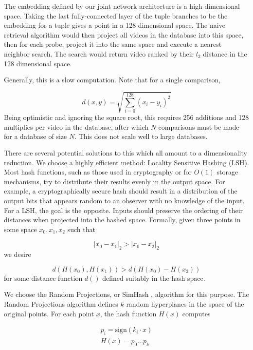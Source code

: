 The embedding defined by our joint network architecture is a high dimensional space. Taking the last fully-connected layer of the tuple branches to be the embedding for a tuple gives a point in a 128 dimensional space. The naive retrieval algorithm would then project all videos in the database into this space, then for each probe, project it into the same space and execute a nearest neighbor search. The search would return video ranked by their $l_2$ distance in the 128 dimensional space.

Generally, this is a slow computation. Note that for a single comparison, 

\begin{equation}
    d(x, y) = \sqrt{\sum_{i=0}^{128} (x_i - y_i)^2}
\end{equation} 
Being optimistic and ignoring the square root, this requires 256 additions and 128 multiplies per video in the database, after which $N$ comparisons must be made for a database of size $N$. This does not scale well to large databases.

There are several potential solutions to this which all amount to a dimensionality reduction. We choose a highly efficient method: Locality Sensitive Hashing (LSH). Most hash functions, such as those used in cryptography or for $O(1)$ storage mechanisms, try to distribute their results evenly in the output space. For example, a cryptographically secure hash should result in a distribution of the output bits that appears random to an observer with no knowledge of the input. For a LSH, the goal is the opposite. Inputs should preserve the ordering of their distances when projected into the hashed space. Formally, given three points in some space $x_0, x_1, x_2$ such that 

\begin{equation}
|x_0 - x_1|_2 > |x_0 - x_2|_2
\end{equation}
we desire

\begin{equation}
d(H(x_0), H(x_1)) > d(H(x_0) - H(x_2))
\end{equation}
for some distance function $d()$ defined suitably in the hash space.

We choose the Random Projections, or SimHash \cite{charikar2002similarity}, algorithm for this purpose. The Random Projections algorithm defines $k$ random hyperplanes in the space of the original points. For each point $x$, the hash function $H(x)$ computes

\begin{align}
    p_i = \text{sign}(k_i \cdot x) \\
    H(x) = p_0...p_k
\end{align}

